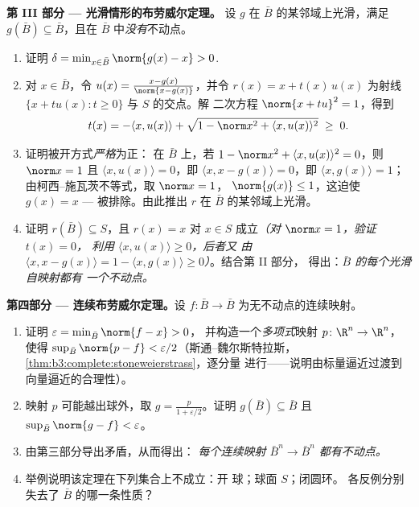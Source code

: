 \begin{problem}
\medskip
\noindent\textbf{第 III 部分 --- 光滑情形的布劳威尔定理。} 设 $g$
在 $\bar B$ 的某邻域上光滑，满足 $g(\bar B)
\subseteq \bar B$，且在 $\bar B$ 中\emph{没有}不动点。
\begin{enumerate}[resume]
  \item 证明 $\delta = \min_{x\in\bar B}\norm{g(x) - x} >
        0$.
  \item 对 $x \in \bar B$，令 $u(x) = \frac{x -
        g(x)}{\norm{x - g(x)}}$，并令 $r(x) = x +
        t(x)\,u(x)$ 为射线
        $\{x + tu(x) : t \geq 0\}$ 与 $S$ 的交点。解
        二次方程 $\norm{x + tu}^2 = 1$，得到
        \[
        t(x) = -\langle x, u(x)\rangle +
        \sqrt{1 - \norm x^2 + \langle x, u(x)\rangle^2}
        \;\geq\; 0 .
        \]
  \item 证明被开方式\emph{严格}为正：
        在 $\bar B$ 上，若 $1 - \norm x^2 + \langle x,
        u(x)\rangle^2 = 0$，则 $\norm x = 1$ 且 $\langle
        x, u(x)\rangle = 0$，即 $\langle x, x -
        g(x)\rangle = 0$，即 $\langle x, g(x)\rangle =
        1$；由柯西–施瓦茨不等式，取 $\norm x = 1$，
        $\norm{g(x)} \leq 1$，这迫使 $g(x) = x$ ---
        被排除。由此推出 $r$ 在
        $\bar B$ 的某邻域上光滑。
  \item 证明 $r(\bar B) \subseteq S$，且 $r(x) = x$ 对 $x
        \in S$ 成立\emph{（对 $\norm x = 1$，验证 $t(x) = 0$，
        利用 $\langle x, u(x)\rangle \geq 0$，后者又
        由 $\langle x, x - g(x)\rangle = 1 -
        \langle x, g(x)\rangle \geq 0$）}。结合第 II 部分，
        得出：\emph{$\bar B$ 的每个光滑自映射都有
        一个不动点。}
\end{enumerate}

\medskip
\noindent\textbf{第四部分 --- 连续布劳威尔定理。}设
$f\colon\bar B\to\bar B$ 为无不动点的连续映射。
\begin{enumerate}[resume]
  \item 证明 $\varepsilon = \min_{\bar B}\norm{f - x} > 0$，
        并构造一个\emph{多项式}映射 $p\colon\R^n\to
        \R^n$，使得 $\sup_{\bar B}\norm{p - f} <
        \varepsilon/2$（斯通–魏尔斯特拉斯，
        \cref{thm:b3:complete:stoneweierstrass}，逐分量
        进行——说明由标量逼近过渡到
        向量逼近的合理性）。
  \item 映射 $p$ 可能越出球外，取 $g = \frac{p}{1
        + \varepsilon/2}$。证明 $g(\bar B) \subseteq \bar B$
        且 $\sup_{\bar B}\norm{g - f} < \varepsilon$。
  \item 由第三部分导出矛盾，从而得出：
        \emph{每个连续映射 $\bar B^n \to \bar B^n$
        都有不动点。}
  \item 举例说明该定理在下列集合上不成立：开
        球；球面 $S$；闭圆环。
        各反例分别失去了 $\bar B$ 的哪一条性质？
\end{enumerate}


\end{problem}
